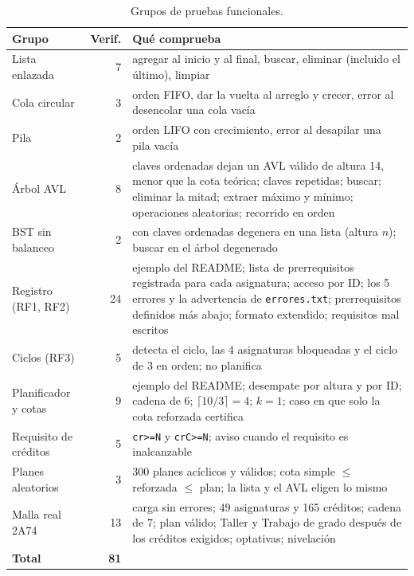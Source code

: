 \documentclass[11pt,letterpaper]{article}
\newcommand{\num}[1]{\pgfmathprintnumber[int detect]{#1}}
\begin{document}
\begin{table}[H]
\centering
\small
\caption{Grupos de pruebas funcionales.}
\label{tab:pruebas}
\begin{tabularx}{\linewidth}{@{}l r L@{}}
\toprule
\textbf{Grupo} & \textbf{Verif.} & \textbf{Qué comprueba} \\
\midrule
Lista enlazada & 7 & agregar al inicio y al final, buscar, eliminar (incluido el último), limpiar \\
Cola circular & 3 & orden FIFO, dar la vuelta al arreglo y crecer, error al desencolar una cola vacía \\
Pila & 2 & orden LIFO con crecimiento, error al desapilar una pila vacía \\
Árbol AVL & 8 & \num{10000} claves ordenadas dejan un AVL válido de altura 14, menor que la cota teórica; claves repetidas; buscar; eliminar la mitad; extraer máximo y mínimo; \num{20000} operaciones aleatorias; recorrido en orden \\
BST sin balanceo & 2 & con claves ordenadas degenera en una lista (altura $n$); buscar en el árbol degenerado \\
Registro (RF1, RF2) & 24 & ejemplo del README; lista de prerrequisitos registrada para cada asignatura; acceso por ID; los 5 errores y la advertencia de \texttt{errores.txt}; prerrequisitos definidos más abajo; formato extendido; requisitos mal escritos \\
Ciclos (RF3) & 5 & detecta el ciclo, las 4 asignaturas bloqueadas y el ciclo de 3 en orden; no planifica \\
Planificador y cotas & 9 & ejemplo del README; desempate por altura y por ID; cadena de 6; $\lceil 10/3 \rceil = 4$; $k = 1$; caso en que solo la cota reforzada certifica \\
Requisito de créditos & 5 & \texttt{cr>=N} y \texttt{crC>=N}; aviso cuando el requisito es inalcanzable \\
Planes aleatorios & 3 & 300 planes acíclicos y válidos; cota simple $\leq$ reforzada $\leq$ plan; la lista y el AVL eligen lo mismo \\
Malla real 2A74 & 13 & carga sin errores; 49 asignaturas y 165 créditos; cadena de 7; plan válido; Taller y Trabajo de grado después de los créditos exigidos; optativas; nivelación \\
\midrule
\textbf{Total} & \textbf{81} & \\
\bottomrule
\end{tabularx}
\end{table}
\end{document}
